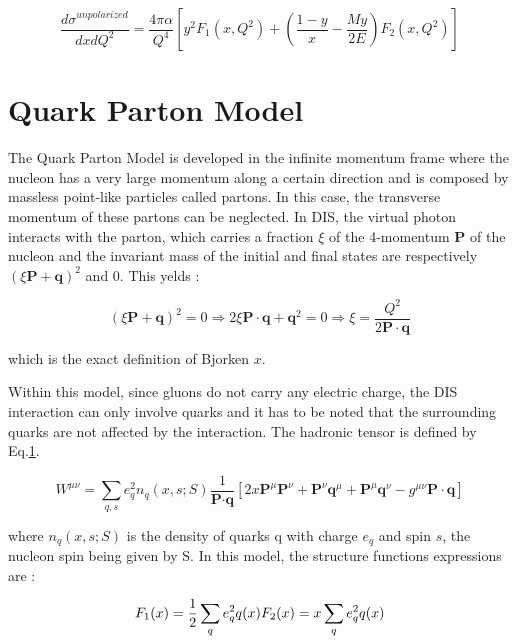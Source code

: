 \begin{equation}
  \frac{d\sigma^{unpolarized}}{dxdQ^2} = \frac{4\pi\alpha}{Q^4}[y^2F_1(x,Q^2)+(\frac{1-y}{x}-\frac{My}{2E})F_2(x,Q^2)]
\end{equation}


\section{Quark Parton Model}

The Quark Parton Model is developed in the infinite momentum frame where the nucleon has a very large momentum
along a certain direction and is composed by massless point-like particles called partons. In this case, the
transverse momentum of these partons can be neglected. In DIS, the virtual photon interacts with the parton,
which carries a fraction $\xi$ of the 4-momentum \textbf{P} of the nucleon and the invariant mass of the initial
and final states are respectively $(\xi\textbf{P}+\textbf{q})^2$ and 0. This yelds :

\begin{equation}
  (\xi\textbf{P}+\textbf{q})^2 = 0 \Rightarrow 2\xi\textbf{P}\cdot\textbf{q}+\textbf{q}^2 = 0 \Rightarrow \xi = \frac{Q^2}{2\textbf{P}\cdot\textbf{q}}
\end{equation}

which is the exact definition of Bjorken $x$.

Within this model, since gluons do not carry any electric charge, the DIS interaction can only involve quarks and
it has to be noted that the surrounding quarks are not affected by the interaction. The hadronic tensor is defined
by Eq.\ref{}.

\begin{equation}
  W^{\mu\nu} = \sum\limits_{q,s}e^2_qn_q(x,s;S)\frac{1}{\textbf{P}\cdot\textbf{q}}[2x\textbf{P}^{\mu}\textbf{P}^{\nu}
  +\textbf{P}^{\nu}\textbf{q}^{\mu}+\textbf{P}^{\mu}\textbf{q}^{\nu}-g^{\mu\nu}\textbf{P}\cdot\textbf{q}]
\end{equation}

where $n_q(x,s;S)$ is the density of quarks q with charge $e_q$ and spin $s$, the nucleon spin being given by S.
In this model, the structure functions expressions are :

\begin{equation}
  F_1(x)=\frac{1}{2}\sum\limits_{q}e^2_qq(x) \\
  F_2(x)=x\sum\limits_{q}e^2_qq(x)
\end{equation}

